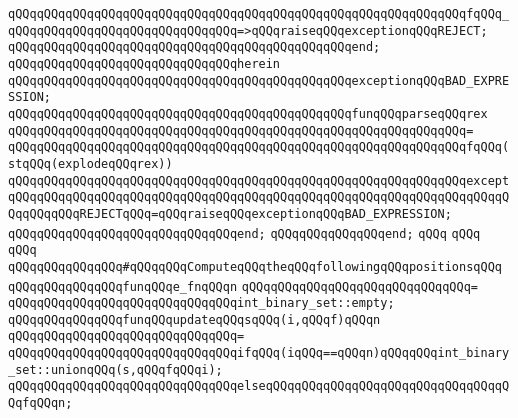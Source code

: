 \verb|qQQqqQQqqQQqqQQqqQQqqQQqqQQqqQQqqQQqqQQqqQQqqQQqqQQqqQQqqQQqqQQqfqQQq_qQQqqQQqqQQqqQQqqQQqqQQqqQQqqQQq=>qQQqraiseqQQqexceptionqQQqREJECT;|\newline
\verb|qQQqqQQqqQQqqQQqqQQqqQQqqQQqqQQqqQQqqQQqqQQqqQQqend;|\newline
\newline
\verb|qQQqqQQqqQQqqQQqqQQqqQQqqQQqqQQqherein|\newline
\newline
\verb|qQQqqQQqqQQqqQQqqQQqqQQqqQQqqQQqqQQqqQQqqQQqqQQqexceptionqQQqBAD_EXPRESSION;|\newline
\newline
\verb|qQQqqQQqqQQqqQQqqQQqqQQqqQQqqQQqqQQqqQQqqQQqqQQqfunqQQqparseqQQqrex|\newline
\verb|qQQqqQQqqQQqqQQqqQQqqQQqqQQqqQQqqQQqqQQqqQQqqQQqqQQqqQQqqQQqqQQq=|\newline
\verb|qQQqqQQqqQQqqQQqqQQqqQQqqQQqqQQqqQQqqQQqqQQqqQQqqQQqqQQqqQQqqQQqfqQQq(stqQQq(explodeqQQqrex))|\newline
\verb|qQQqqQQqqQQqqQQqqQQqqQQqqQQqqQQqqQQqqQQqqQQqqQQqqQQqqQQqqQQqqQQqexcept|\newline
\verb|qQQqqQQqqQQqqQQqqQQqqQQqqQQqqQQqqQQqqQQqqQQqqQQqqQQqqQQqqQQqqQQqqQQqqQQqqQQqqQQqREJECTqQQq=qQQqraiseqQQqexceptionqQQqBAD_EXPRESSION;|\newline
\verb|qQQqqQQqqQQqqQQqqQQqqQQqqQQqqQQqend;|\newline
\verb|qQQqqQQqqQQqqQQqend;|\newline
\verb|qQQq|\newline
\verb|qQQq|\newline
\verb|qQQq|\newline
\verb|qQQqqQQqqQQqqQQq#qQQqqQQqComputeqQQqtheqQQqfollowingqQQqpositionsqQQq|\newline
\newline
\verb|qQQqqQQqqQQqqQQqfunqQQqe_fnqQQqn|\newline
\verb|qQQqqQQqqQQqqQQqqQQqqQQqqQQqqQQq=|\newline
\verb|qQQqqQQqqQQqqQQqqQQqqQQqqQQqqQQqint_binary_set::empty;|\newline
\newline
\verb|qQQqqQQqqQQqqQQqfunqQQqupdateqQQqsqQQq(i,qQQqf)qQQqn|\newline
\verb|qQQqqQQqqQQqqQQqqQQqqQQqqQQqqQQq=|\newline
\verb|qQQqqQQqqQQqqQQqqQQqqQQqqQQqqQQqifqQQq(iqQQq==qQQqn)qQQqqQQqint_binary_set::unionqQQq(s,qQQqfqQQqi);|\newline
\verb|qQQqqQQqqQQqqQQqqQQqqQQqqQQqqQQqelseqQQqqQQqqQQqqQQqqQQqqQQqqQQqqQQqqQQqfqQQqn;|\newline
